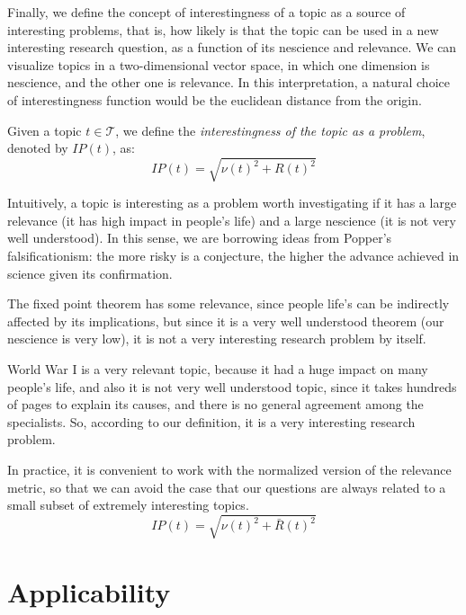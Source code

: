 Finally, we define the concept of interestingness of a topic as a source of interesting problems, that is, how likely is that the topic can be used in a new interesting research question, as a function of its nescience and relevance. We can visualize topics in a two-dimensional vector space, in which one dimension is nescience, and the other one is relevance. In this interpretation, a natural choice of interestingness function would be the euclidean distance from the origin.

\begin{definition}
Given a topic $t \in \mathcal{T}$, we define the \emph{interestingness of the topic as a problem}, denoted by $IP(t)$, as:
\[
IP(t) = \sqrt{ \nu(t)^2 +  R(t)^2 }
\]
\end{definition}

Intuitively, a topic is interesting as a problem worth investigating if it has a large relevance (it has high impact in people's life) and a large nescience (it is not very well understood). In this sense, we are borrowing ideas from Popper's falsificationism: the more risky is a conjecture, the higher the advance achieved in science given its confirmation.

\begin{example}
\label{ex:fixed_point}
The fixed point theorem has some relevance, since people life's can be indirectly affected by its implications, but since it is a very well understood theorem (our nescience is very low), it is not a very interesting research problem by itself.

World War I is a very relevant topic, because it had a huge impact on many people's life, and also it is not very well understood topic, since it takes hundreds of pages to explain its causes, and there is no general agreement among the specialists. So, according to our definition, it is a very interesting research problem.
\end{example}

In practice, it is convenient to work with the normalized version of the relevance metric, so that we can avoid the case that our questions are always related to a small subset of extremely interesting topics.
\[
IP(t) = \sqrt{ \nu(t)^2 +  \bar{R}(t)^2 }
\]

%
%

\section{Applicability}

